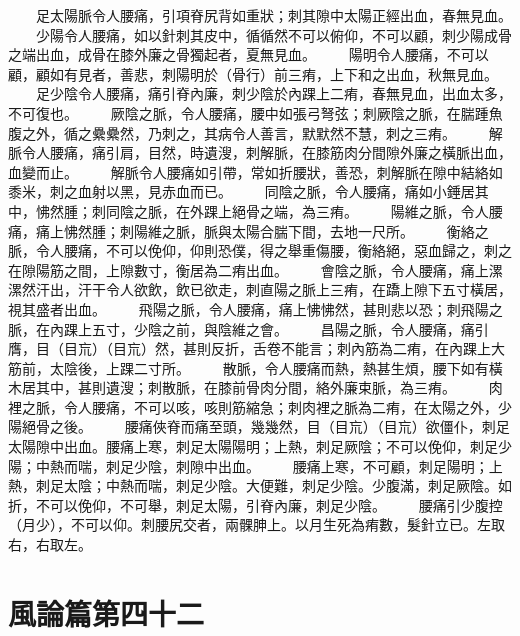 　　足太陽脈令人腰痛，引項脊尻背如重狀；刺其隙中太陽正經出血，春無見血。
　　少陽令人腰痛，如以針刺其皮中，循循然不可以俯仰，不可以顧，刺少陽成骨之端出血，成骨在膝外廉之骨獨起者，夏無見血。
　　陽明令人腰痛，不可以顧，顧如有見者，善悲，刺陽明於（骨行）前三痏，上下和之出血，秋無見血。
　　足少陰令人腰痛，痛引脊內廉，刺少陰於內踝上二痏，春無見血，出血太多，不可復也。
　　厥陰之脈，令人腰痛，腰中如張弓弩弦；刺厥陰之脈，在腨踵魚腹之外，循之纍纍然，乃刺之，其病令人善言，默默然不慧，刺之三痏。
　　解脈令人腰痛，痛引肩，目然，時遺溲，刺解脈，在膝筋肉分間隙外廉之橫脈出血，血變而止。
　　解脈令人腰痛如引帶，常如折腰狀，善恐，刺解脈在隙中結絡如黍米，刺之血射以黑，見赤血而已。
　　同陰之脈，令人腰痛，痛如小錘居其中，怫然腫；刺同陰之脈，在外踝上絕骨之端，為三痏。
　　陽維之脈，令人腰痛，痛上怫然腫；刺陽維之脈，脈與太陽合腨下間，去地一尺所。
　　衡絡之脈，令人腰痛，不可以俛仰，仰則恐僕，得之舉重傷腰，衡絡絕，惡血歸之，刺之在隙陽筋之間，上隙數寸，衡居為二痏出血。
　　會陰之脈，令人腰痛，痛上漯漯然汗出，汗干令人欲飲，飲已欲走，刺直陽之脈上三痏，在蹻上隙下五寸橫居，視其盛者出血。
　　飛陽之脈，令人腰痛，痛上怫怫然，甚則悲以恐；刺飛陽之脈，在內踝上五寸，少陰之前，與陰維之會。
　　昌陽之脈，令人腰痛，痛引膺，目（目巟）（目巟）然，甚則反折，舌卷不能言；刺內筋為二痏，在內踝上大筋前，太陰後，上踝二寸所。
　　散脈，令人腰痛而熱，熱甚生煩，腰下如有橫木居其中，甚則遺溲；刺散脈，在膝前骨肉分間，絡外廉束脈，為三痏。
　　肉裡之脈，令人腰痛，不可以咳，咳則筋縮急；刺肉裡之脈為二痏，在太陽之外，少陽絕骨之後。
　　腰痛俠脊而痛至頭，幾幾然，目（目巟）（目巟）欲僵仆，刺足太陽隙中出血。腰痛上寒，刺足太陽陽明；上熱，刺足厥陰；不可以俛仰，刺足少陽；中熱而喘，刺足少陰，刺隙中出血。
　　腰痛上寒，不可顧，刺足陽明；上熱，刺足太陰；中熱而喘，刺足少陰。大便難，刺足少陰。少腹滿，刺足厥陰。如折，不可以俛仰，不可舉，刺足太陽，引脊內廉，刺足少陰。
　　腰痛引少腹控（月少），不可以仰。刺腰尻交者，兩髁胂上。以月生死為痏數，髮針立已。左取右，右取左。


\section{風論篇第四十二}

